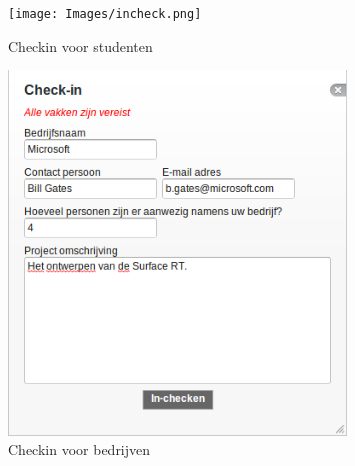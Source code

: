 \begin{figure}[here]
	\centering
	\texttt{[image: Images/incheck.png]}
	\caption{Checkin voor studenten}
	\label{fig:checkin-student}
\end{figure}

\begin{figure}[here]
	\centering
	\includegraphics[width=0.8\textwidth]{Images/checkin-company.png}
	\caption{Checkin voor bedrijven}
	\label{fig:checkin-bedrijf}
\end{figure}
